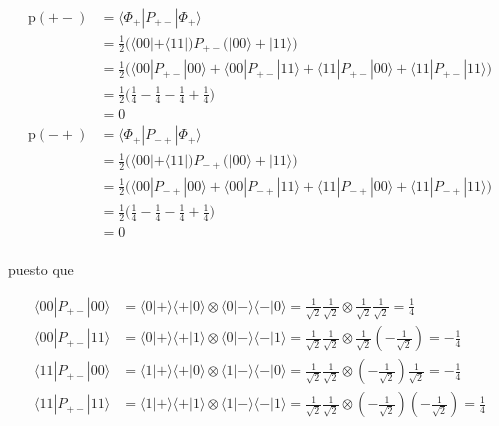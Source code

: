 \documentclass{article}
\begin{document}
\begin{align*}
  \text{p}(+-) &= \langle \Phi_+ | P_{+-} |\Phi_+ \rangle \\ 
    &= \frac{1}{2}\Big( \langle 00| + \langle 11| \Big)
        P_{+-}
        \Big(|00\rangle + |11\rangle\Big) \\
    &= \frac{1}{2}\Big(  
      \langle 00|P_{+-}|00\rangle + \langle 00|P_{+-}|11\rangle +
      \langle 11|P_{+-}|00\rangle + \langle 11|P_{+-}|11\rangle
    \Big) \\
    &= \frac{1}{2}\Big(
      \frac{1}{4} - \frac{1}{4} - \frac{1}{4} + \frac{1}{4}
    \Big) \\ 
    &= 0 \\
  \text{p}(-+) &= \langle \Phi_+ | P_{-+} |\Phi_+ \rangle \\ 
    &= \frac{1}{2}\Big( \langle 00| + \langle 11| \Big)
        P_{-+}
        \Big(|00\rangle + |11\rangle\Big) \\
    &= \frac{1}{2}\Big(  
      \langle 00|P_{-+}|00\rangle + \langle 00|P_{-+}|11\rangle +
      \langle 11|P_{-+}|00\rangle + \langle 11|P_{-+}|11\rangle
    \Big) \\
    &= \frac{1}{2}\Big(
      \frac{1}{4} - \frac{1}{4} - \frac{1}{4} + \frac{1}{4}
    \Big) \\ 
    &= 0 \\
\end{align*}

puesto que

\begin{align*}
  \langle 00|P_{+-}|00\rangle 
    &= \langle 0|+\rangle\langle +|0\rangle
      \otimes \langle 0|-\rangle\langle -|0\rangle
    = \frac{1}{\sqrt{2}}\frac{1}{\sqrt{2}}
      \otimes \frac{1}{\sqrt{2}}\frac{1}{\sqrt{2}}
    = \frac{1}{4} \\
  \langle 00|P_{+-}|11\rangle 
    &= \langle 0|+\rangle\langle +|1\rangle
      \otimes \langle 0|-\rangle\langle -|1\rangle
    = \frac{1}{\sqrt{2}}\frac{1}{\sqrt{2}}
      \otimes \frac{1}{\sqrt{2}}(-\frac{1}{\sqrt{2}})
    = -\frac{1}{4} \\
  \langle 11|P_{+-}|00\rangle 
    &= \langle 1|+\rangle\langle +|0\rangle
      \otimes \langle 1|-\rangle\langle -|0\rangle
    = \frac{1}{\sqrt{2}}\frac{1}{\sqrt{2}}
      \otimes (-\frac{1}{\sqrt{2}})\frac{1}{\sqrt{2}}
    = -\frac{1}{4} \\
  \langle 11|P_{+-}|11\rangle 
    &= \langle 1|+\rangle\langle +|1\rangle
      \otimes \langle 1|-\rangle\langle -|1\rangle
    = \frac{1}{\sqrt{2}}\frac{1}{\sqrt{2}}
      \otimes (-\frac{1}{\sqrt{2}})(-\frac{1}{\sqrt{2}})
    = \frac{1}{4} \\
\end{align*}
\end{document}
